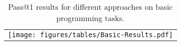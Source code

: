 \begin{table*}[h]
    \centering
    \begin{tabular}{c}
    \hspace{-2.5mm}
    \texttt{[image: figures/tables/Basic-Results.pdf]}
    \end{tabular}
    \caption{Pass@1 results for different approaches on basic programming tasks.}
    \label{tab:basic-dataset-result}
\end{table*}
